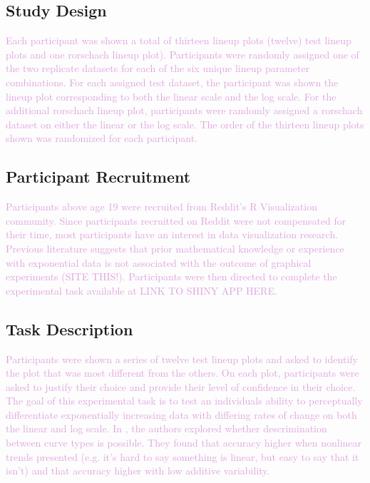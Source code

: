 \documentclass[]{interact}
\theoremstyle{plain}%
\theoremstyle{definition}
\theoremstyle{remark}
\begin{document}
\hypertarget{study-design}{%
\subsection{Study Design}\label{study-design}}

\textcolor{Plum}{
Each participant was shown a total of thirteen lineup plots (twelve) test lineup plots and one rorschach lineup plot). Participants were randomly assigned one of the two replicate datasets for each of the six unique lineup parameter combinations. For each assigned test dataset, the participant was shown the lineup plot corresponding to both the linear scale and the log scale. For the additional rorschach lineup plot, participants were randomly assigned a rorschach dataset on either the linear or the log scale. The order of the thirteen lineup plots shown was randomized for each participant. 
}

\hypertarget{participant-recruitment}{%
\subsection{Participant Recruitment}\label{participant-recruitment}}

\textcolor{Plum}{Participants above age 19 were recruited from Reddit's R Visualization community. 
Since participants recruitted on Reddit were not compensated for their time, most participants have an interest in data visualization research. 
Previous literature suggests that prior mathematical knowledge or experience with exponential data is not associated with the outcome of graphical experiments (SITE THIS!). 
Participants were then directed to complete the experimental task available at LINK TO SHINY APP HERE.
}

\hypertarget{task-description}{%
\subsection{Task Description}\label{task-description}}

\textcolor{Plum}{Participants were shown a series of twelve test lineup plots and asked to identify the plot that was most different from the others. 
On each plot, participants were asked to justify their choice and provide their level of confidence in their choice.
The goal of this experimental task is to test an individuals ability to perceptually differentiate exponentially increasing data with differing rates of change on both the linear and log scale. 
In \cite{best_perception_2007}, the authors explored whether descrimination between curve types is possible. 
They found that accuracy higher when nonlinear trends presented (e.g. it’s hard to say something is linear, but easy to say that it isn’t) and that accuracy higher with low additive variability.
}
\end{document}
